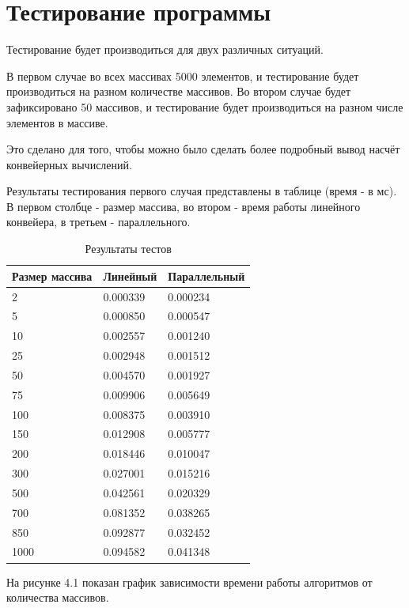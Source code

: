 \section{Тестирование программы}
Тестирование будет производиться для двух различных ситуаций.

В первом случае во всех массивах 5000 элементов, и тестирование будет производиться на разном количестве массивов.
Во втором случае будет зафиксировано 50 массивов, и тестирование будет производиться на разном числе элементов в массиве.

Это сделано для того, чтобы можно было сделать более подробный вывод насчёт конвейерных вычислений.

Результаты тестирования первого случая представлены в таблице (время - в мс). 
В первом столбце - размер массива, во втором - время работы линейного конвейера, в третьем - параллельного.

\FloatBarrier
\begin{table}[h]
	\caption{Результаты тестов}
	\centering
	\begin{tabular}{ | l | l | l |}
		\hline
		Размер массива & Линейный & Параллельный\\ 
		\hline
		2 & 0.000339 & 0.000234\\
		5 & 0.000850 & 0.000547\\
		10 & 0.002557 & 0.001240\\
		25 & 0.002948 & 0.001512\\
		50 & 0.004570 & 0.001927\\
		75 & 0.009906 & 0.005649\\
		100 & 0.008375 & 0.003910\\
		150 & 0.012908 & 0.005777\\
		200 & 0.018446 & 0.010047\\
		300 & 0.027001 & 0.015216\\
		500 & 0.042561 & 0.020329\\
		700 & 0.081352 & 0.038265\\
		850 & 0.092877 & 0.032452 \\
		1000 & 0.094582 & 0.041348\\
		\hline
	\end{tabular}
\end{table}
\FloatBarrier

На рисунке 4.1 показан график зависимости времени работы алгоритмов от количества массивов.

